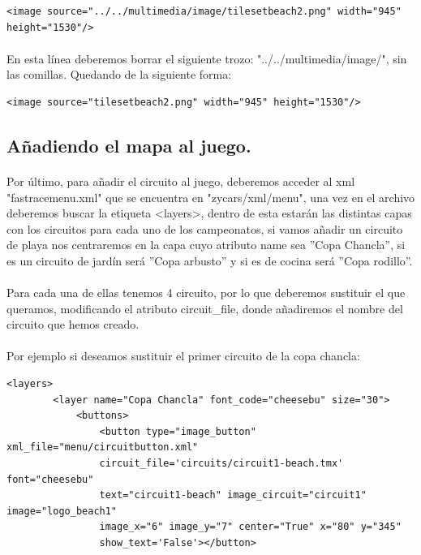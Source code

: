 \begin{lstlisting}[style=XML]
<image source="../../multimedia/image/tilesetbeach2.png" width="945" height="1530"/>
\end{lstlisting}

\paragraph{}
En esta línea deberemos borrar el siguiente trozo: "../../multimedia/image/", sin las comillas. Quedando de la siguiente forma:

\begin{lstlisting}[style=XML]
<image source="tilesetbeach2.png" width="945" height="1530"/>
\end{lstlisting}

\subsection{Añadiendo el mapa al juego.}

\paragraph{}
Por último, para añadir el circuito al juego, deberemos acceder al xml "fastracemenu.xml" que se encuentra en 
"zycars/xml/menu", una vez en el archivo deberemos buscar la etiqueta <layers>,
dentro de esta estarán las distintas capas
con los circuitos para cada uno de los campeonatos, si vamos añadir un circuito de playa nos centraremos en la capa cuyo atributo
name sea ''Copa Chancla'', si es un circuito de jardín será ''Copa arbusto'' y si es de cocina será ''Copa rodillo''.

\paragraph{}
Para cada una de ellas tenemos 4 circuito, por lo que deberemos sustituir el que queramos, modificando el atributo circuit\_file,
donde añadiremos el nombre del circuito que hemos creado. 

\paragraph{}
Por ejemplo si deseamos sustituir el primer circuito de la copa chancla:

\begin{lstlisting}[style=XML]
    <layers>
        <layer name="Copa Chancla" font_code="cheesebu" size="30">
            <buttons>
                <button type="image_button" xml_file="menu/circuitbutton.xml" 
                circuit_file='circuits/circuit1-beach.tmx' font="cheesebu" 
                text="circuit1-beach" image_circuit="circuit1" image="logo_beach1" 
                image_x="6" image_y="7" center="True" x="80" y="345" 
                show_text='False'></button>
\end{lstlisting}


